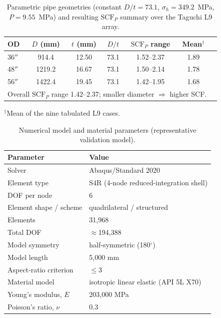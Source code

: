 
\begin{table}[t]
\centering
\caption{Parametric pipe geometries (constant $D/t=73.1$, $\sigma_h=349.2$~MPa,
$P=9.55$~MPa) and resulting $\mathrm{SCF}_P$ summary over the Taguchi L9 array.}
\label{tab:parametric}
\begin{tabular}{lcccccc}
\toprule
OD & $D$ (mm) & $t$ (mm) & $D/t$ & $\mathrm{SCF}_P$ range & Mean$^{\dagger}$ \\
\midrule
36$''$ & 914.4  & 12.50 & 73.1 & 1.52--2.37 & 1.89 \\
48$''$ & 1219.2 & 16.67 & 73.1 & 1.50--2.14 & 1.78 \\
56$''$ & 1422.4 & 19.45 & 73.1 & 1.42--1.95 & 1.68 \\
\midrule
\multicolumn{6}{l}{Overall $\mathrm{SCF}_P$ range 1.42--2.37; smaller diameter $\Rightarrow$ higher SCF.}\\
\bottomrule
\end{tabular}

\smallskip
\footnotesize{$^{\dagger}$Mean of the nine tabulated L9 cases.}
\end{table}

\begin{table}[t]
\centering
\caption{Numerical model and material parameters (representative validation model).}
\label{tab:model}
\begin{tabular}{ll}
\toprule
Parameter & Value \\
\midrule
Solver & Abaqus/Standard 2020 \\
Element type & S4R (4-node reduced-integration shell) \\
DOF per node & 6 \\
Element shape / scheme & quadrilateral / structured \\
Elements & 31{,}968 \\
Total DOF & $\approx$194{,}388 \\
Model symmetry & half-symmetric (180$^\circ$) \\
Model length & 5{,}000 mm \\
Aspect-ratio criterion & $\leq 3$ \\
Material model & isotropic linear elastic (API 5L X70) \\
Young's modulus, $E$ & 203{,}000 MPa \\
Poisson's ratio, $\nu$ & 0.3 \\
\bottomrule
\end{tabular}
\end{table}


